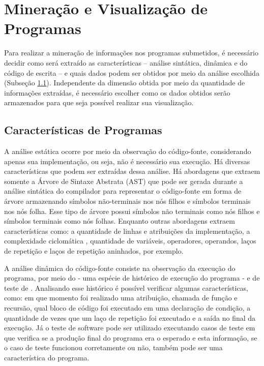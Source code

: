 	\section{Mineração e Visualização de Programas}
	\label{sec:MinVisual}
		Para realizar a mineração de informações nos programas submetidos, é necessário
		decidir como será extraído as características -- análise sintática, dinâmica e
		do código de escrita -- e quais dados podem ser obtidos por meio da análise
		escolhida (Subseção \ref{subSec:Caracteristicas}). Independente da dimensão
		obtida por meio da quantidade de informações extraídas, é necessário escolher
		como os dados obtidos serão armazenados para que seja possível realizar sua visualização.
		
		\subsection{Características de Programas}
		\label{subSec:Caracteristicas}

			A análise estática ocorre por meio da observação do código-fonte, considerando
			apenas sua implementação, ou seja, não é necessário sua execução. Há diversas
			características que podem ser extraídas dessa análise. Há abordagens que extraem
			somente a Árvore de Sintaxe Abstrata (AST) que pode ser gerada durante a análise
			sintática do compilador para representar o código-fonte em forma de árvore
			armazenando símbolos não-terminais nos nós filhos e símbolos terminais nos
			nós folha. Esse tipo de árvore possui símbolos não terminais como nós filhos
			e símbolos terminais como nós folhas. Enquanto outras abordagens extraem
			características como: a quantidade de linhas e atribuições da implementação,
			a complexidade ciclomática \cite{mccabe}, quantidade de variáveis, operadores,
			operandos, laços de repetição e laços de repetição aninhados, por exemplo.
			
			A análise dinâmica do código-fonte consiste na observação da execução do
			programa, por meio do  - uma espécie de histórico de execução
			do programa - e de teste de . Analisando esse histórico é
			possível verificar algumas características, como: em que momento foi realizado
			uma atribuição, chamada de função e recursão, qual bloco de código foi
			executado em uma declaração de condição, a quantidade de vezes que um laço
			de repetição foi executado e a saída no final da execução. Já o teste de
			software pode ser utilizado executando casos de teste em que verifica se a
			produção final do programa era o esperado e esta informação, se o caso de
			teste funcionou corretamente ou não, também pode ser uma característica do programa.
			
